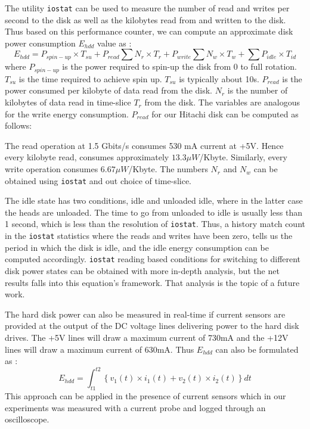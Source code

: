 \documentclass[12pt,onecolumn]{ULieeetran}
\begin{document}
The utility \texttt{iostat} can be used to measure the number of read
and writes per second to the disk as well as the kilobytes read from and
written to the disk. Thus based on this performance counter, we can
compute an approximate disk power consumption $E_{hdd}$ value as :
\begin{equation*}
\label{eqn:hddpwr1}
E_{hdd} = P_{spin-up}\times T_{su} 
        +  P_{read}\sum N_r\times T_r 
        + P_{write}\sum N_w\times T_w 
        + \sum P_{idle}\times T_{id}
\end{equation*}
where $P_{spin-up}$ is the power required to spin-up the disk from 0 to
full rotation. $T_{su}$ is the time required to achieve spin
up. $T_{su}$ is typically about 10s. $P_{read}$ is the power consumed
per kilobyte of data read from the disk. $N_r$ is the number of
kilobytes of data read in time-slice $T_r$ from the disk. The variables
are analogous for the write energy consumption. $P_{read}$ for our
Hitachi disk can be computed as follows:

The read operation at 1.5 Gbits/s consumes 530 mA current at +5V. Hence
every kilobyte read, consumes approximately $13.3 \mu
W$/Kbyte. Similarly, every write operation consumes $6.67 \mu
W$/Kbyte. The numbers $N_r$ and $N_w$ can be obtained using
\texttt{iostat} and out choice of time-slice.

The idle state has two conditions, idle and unloaded idle, where in the
latter case the heads are unloaded. The time to go from unloaded to idle
is usually less than 1 second, which is less than the resolution of
\texttt{iostat}. Thus, a history match count in the \texttt{iostat}
statistics where the reads and writes have been zero, tells us the
period in which the disk is idle, and the idle energy consumption can be
computed accordingly. \texttt{iostat} reading based conditions for
switching to different disk power states can be obtained with more
in-depth analysis, but the net results falls into this equation's
framework. That analysis is the topic of a future work.

The hard disk power can also be measured in real-time if current sensors
are provided at the output of the DC voltage lines delivering power to
the hard disk drives. The +5V lines will draw a maximum current of 730mA
and the +12V lines will draw a maximum current of 630mA. Thus $E_{hdd}$
can also be formulated as :
\begin{equation*}
\label{eq:hddpwr2}
E_{hdd} =  \int_{t1}^{t2} \left \{ v_1(t)\times i_1(t) + v_2(t)\times i_2(t) \right \} dt
\end{equation*}
This approach can be applied in the presence of current sensors which in
our experiments was measured with a current probe and logged through an
oscilloscope.
\end{document}
